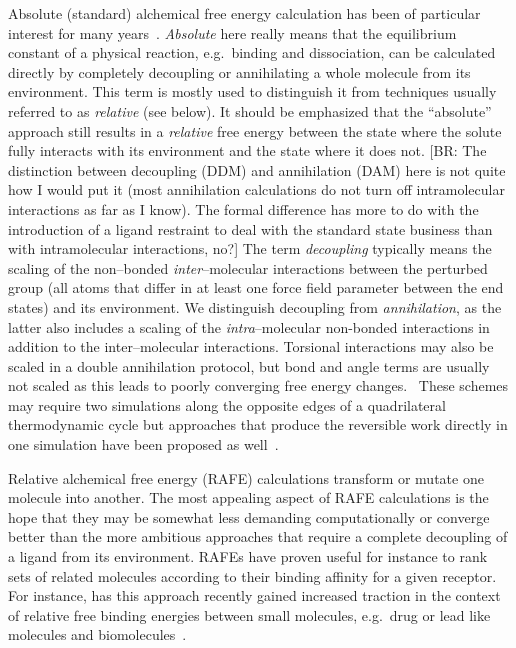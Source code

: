 \documentclass[journal=jctcce,manuscript=article]{achemso}
\begin{document}
Absolute (standard) alchemical free energy calculation has been of
particular interest for many years~\cite{GILSON19971047,
  doi:10.1021/jp0217839, deng_computations_2009, ytreberg_comparison_2006, doi:10.1021/ct500964e, jorgensen1988efficient}.  \emph{Absolute}
here really means that the equilibrium constant of a physical
reaction, e.g.\ binding and dissociation, can be calculated directly
by completely decoupling or annihilating a whole molecule from its environment.
This term is mostly used to distinguish it from techniques usually
referred to as \emph{relative} (see below).  It should be emphasized that the
``absolute'' approach still results in a \emph{relative} free energy
between the state where the solute fully interacts with its environment and the state where it does
not.  
{\color{red}
{\footnotesize [BR: The distinction between decoupling (DDM) and annihilation (DAM) here is not quite how I would put it (most annihilation calculations do not turn off intramolecular interactions as far as I know). 
The formal difference has more to do with the introduction of a ligand restraint to deal with the standard state business than with intramolecular interactions, no?]}}
The term \emph{decoupling} typically means the scaling of the non--bonded
\emph{inter}--molecular interactions between the perturbed group (all atoms
that differ in at least one force field parameter between the end states) and
its environment.  We distinguish decoupling from \emph{annihilation},
as the latter also includes a scaling of
the \emph{intra}--molecular non-bonded interactions in addition to the
inter--molecular interactions.  Torsional interactions may also be scaled in a double annihilation protocol, but bond and angle terms are usually not scaled as this leads to poorly converging free energy changes.~\cite{doi:10.1021/jp981628n}
These schemes may require two
simulations along the opposite edges of a quadrilateral thermodynamic cycle
but approaches that produce the reversible work directly in one simulation
have been proposed as well~\cite{doi:10.1063/1.3519057, C3FD00125C}.

Relative alchemical free energy (RAFE) calculations transform or
mutate one molecule into another. 
{\color{blue}
The most appealing aspect of RAFE calculations is the hope that they may be somewhat less demanding computationally
or converge better than the more ambitious approaches that require a complete decoupling of a ligand from its environment.} 
RAFEs have proven useful for
instance to rank sets of related molecules according to their binding
affinity for a given receptor. For instance, has this approach
recently gained increased traction in the context of relative free
binding energies between small molecules, e.g.\ drug or lead like
molecules and biomolecules~\cite{doi:10.1021/ja512751q,
  doi:10.1021/acs.jctc.6b00991}.
\end{document}
